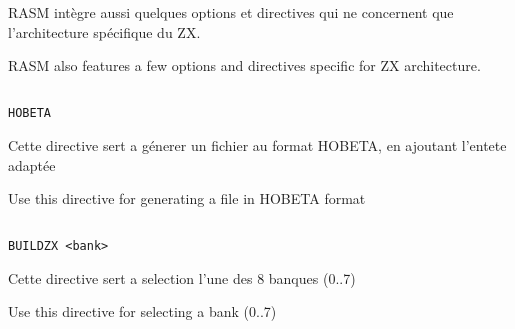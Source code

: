 \section{}\label{PZX}

\begin{xfr}
RASM intègre aussi quelques options et directives qui ne concernent que l'architecture spécifique du ZX.
\end{xfr}

\begin{xen}
RASM also features a few options and directives specific for ZX architecture.
\end{xen}


\subsection{}\label{HOBETA}

\begin{verbatim}
HOBETA
\end{verbatim}

\begin{xfr}
Cette directive sert a génerer un fichier au format HOBETA, en ajoutant l'entete adaptée
\end{xfr}

\begin{xen}
Use this directive for generating a file in HOBETA format
\end{xen}

\subsection{}

\subsubsection{}\label{ZXBANK}

\begin{verbatim}
BUILDZX <bank>
\end{verbatim}

\begin{xfr}
Cette directive sert a selection l'une des 8 banques (0..7)
\end{xfr}

\begin{xen}
Use this directive for selecting a bank (0..7) 
\end{xen}

